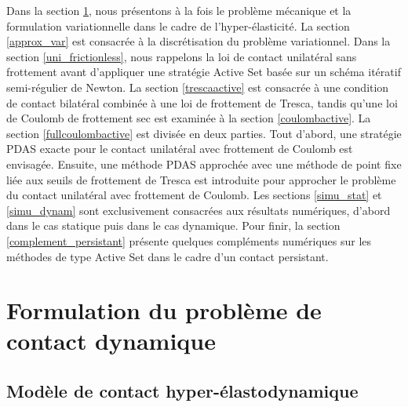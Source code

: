 Dans la section \ref{mod}, nous présentons à la fois le problème mécanique et la formulation variationnelle dans le cadre de l'hyper-élasticité. La section \ref{approx_var} est consacrée à la discrétisation du problème variationnel. Dans la section \ref{uni_frictionless}, nous rappelons la loi de contact unilatéral sans frottement avant d'appliquer une stratégie Active Set basée sur un schéma itératif semi-régulier de Newton. La section \ref{trescaactive} est consacrée à une condition de contact bilatéral combinée à une loi de frottement de Tresca, tandis qu'une loi de Coulomb de frottement sec est examinée à la section \ref{coulombactive}. La section \ref{fullcoulombactive} est divisée en deux parties. Tout d’abord, une stratégie PDAS exacte pour le contact unilatéral avec frottement de Coulomb est envisagée. Ensuite, une méthode PDAS approchée avec une méthode de point fixe liée aux seuils de frottement de Tresca est introduite pour approcher le problème du contact unilatéral avec frottement de Coulomb. Les sections \ref{simu_stat} et \ref{simu_dynam} sont exclusivement consacrées aux résultats numériques, d'abord dans le cas statique puis dans le cas dynamique. Pour finir, la section \ref{complement_persistant} présente quelques compléments numériques sur les méthodes de type Active Set dans le cadre d'un contact persistant. 

\section{Formulation du problème de contact dynamique}\label{mod}

\subsection{Modèle de contact hyper-élastodynamique}\label{model_hyper-elasto}

